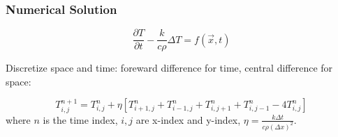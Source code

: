 \begin{frame}
\frametitle{Numerical Solution}
$$
	\frac
		{\partial T}
		{\partial t}
	- \frac{k}{c \rho}
	  \Delta T
	= f(\vec{x}, t)
$$

Discretize space and time: foreward difference for time, central difference for space:

\begin{equation}
	T_{i,j}^{n+1} = 
				T_{i,j}^n
				+ \eta
					\left[ T_{i+1,j}^n + T_{i-1,j}^n 
						 + T_{i,j+1}^n + T_{i,j-1}^n
						 - 4 T_{i,j}^n
					\right]
\end{equation}
where $n$ is the time index, $i,j$ are x-index and y-index, $\eta = \frac{k \Delta t}{c \rho (\Delta x)^2}$.
\end{frame}